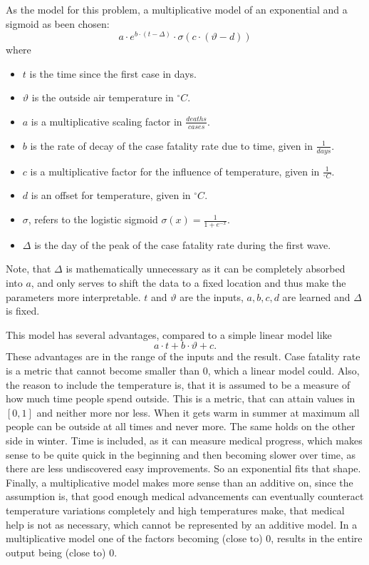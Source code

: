\documentclass{article}
\begin{document}
As the model for this problem, a multiplicative model of an exponential and a sigmoid as been chosen: \begin{equation}
  a \cdot e^{b \cdot (t - \Delta)} \cdot \sigma \left( c \cdot (\vartheta - d) \right) 
\end{equation} where \begin{itemize}
  \item $t$ is the time since the first case in days.
  \item $\vartheta$ is the outside air temperature in $^\circ C$.
  \item $a$ is a multiplicative scaling factor in $\frac{deaths}{cases}$.
  \item $b$ is the rate of decay of the case fatality rate due to time, given in $\frac{1}{days}$.
  \item $c$ is a multiplicative factor for the influence of temperature, given in $\frac{1}{^\circ C}$.
  \item $d$ is an offset for temperature, given in $^\circ C$.
  \item $\sigma$, refers to the logistic sigmoid $\sigma(x) = \frac{1}{1 + e^{-x}}$.
  \item $\Delta$ is the day of the peak of the case fatality rate during the first wave.
\end{itemize}

Note, that $\Delta$ is mathematically unnecessary as it can be completely absorbed into $a$, and only serves to shift the data to a fixed location and thus make the parameters more interpretable. $t$ and $\vartheta$ are the inputs, $a, b, c, d$ are learned and $\Delta$ is fixed.

This model has several advantages, compared to a simple linear model like \begin{equation}
  a \cdot t + b \cdot \vartheta + c.
\end{equation}
These advantages are in the range of the inputs and the result. Case fatality rate is a metric that cannot become smaller than 0, which a linear model could. 
Also, the reason to include the temperature is, that it is assumed to be a measure of how much time people spend outside. This is a metric, that can attain values in $[0, 1]$ and neither more nor less. When it gets warm in summer at maximum all people can be outside at all times and never more. The same holds on the other side in winter. 
Time is included, as it can measure medical progress, which makes sense to be quite quick in the beginning and then becoming slower over time, as there are less undiscovered easy improvements. So an exponential fits that shape.
Finally, a multiplicative model makes more sense than an additive on, since the assumption is, that good enough medical advancements can eventually counteract temperature variations completely and high temperatures make, that medical help is not as necessary, which cannot be represented by an additive model. In a multiplicative model one of the factors becoming (close to) 0, results in the entire output being (close to) 0.
\end{document}
